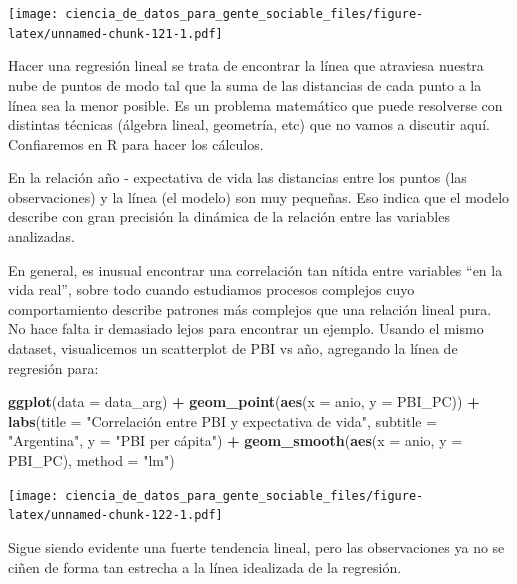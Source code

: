 \documentclass[spanish,]{book}
\newenvironment{Shaded}{\begin{snugshade}}{\end{snugshade}}
\newcommand{\DataTypeTok}[1]{\textcolor[rgb]{0.13,0.29,0.53}{#1}}
\newcommand{\KeywordTok}[1]{\textcolor[rgb]{0.13,0.29,0.53}{\textbf{#1}}}
\newcommand{\NormalTok}[1]{#1}
\newcommand{\OperatorTok}[1]{\textcolor[rgb]{0.81,0.36,0.00}{\textbf{#1}}}
\newcommand{\StringTok}[1]{\textcolor[rgb]{0.31,0.60,0.02}{#1}}
\begin{document}
\texttt{[image: ciencia\_de\_datos\_para\_gente\_sociable\_files/figure-latex/unnamed-chunk-121-1.pdf]}

Hacer una regresión lineal se trata de encontrar la línea que atraviesa nuestra nube de puntos de modo tal que la suma de las distancias de cada punto a la línea sea la menor posible. Es un problema matemático que puede resolverse con distintas técnicas (álgebra lineal, geometría, etc) que no vamos a discutir aquí. Confiaremos en R para hacer los cálculos.

En la relación año - expectativa de vida las distancias entre los puntos (las observaciones) y la línea (el modelo) son muy pequeñas. Eso indica que el modelo describe con gran precisión la dinámica de la relación entre las variables analizadas.

En general, es inusual encontrar una correlación tan nítida entre variables ``en la vida real'', sobre todo cuando estudiamos procesos complejos cuyo comportamiento describe patrones más complejos que una relación lineal pura. No hace falta ir demasiado lejos para encontrar un ejemplo. Usando el mismo dataset, visualicemos un scatterplot de PBI vs año, agregando la línea de regresión para:

\begin{Shaded}
\begin{Highlighting}[]
\KeywordTok{ggplot}\NormalTok{(}\DataTypeTok{data =}\NormalTok{ data_arg) }\OperatorTok{+}\StringTok{ }
\StringTok{    }\KeywordTok{geom_point}\NormalTok{(}\KeywordTok{aes}\NormalTok{(}\DataTypeTok{x =}\NormalTok{ anio, }\DataTypeTok{y =}\NormalTok{ PBI_PC)) }\OperatorTok{+}
\StringTok{    }\KeywordTok{labs}\NormalTok{(}\DataTypeTok{title =} \StringTok{"Correlación entre PBI y expectativa de vida"}\NormalTok{,}
         \DataTypeTok{subtitle =} \StringTok{"Argentina"}\NormalTok{,}
         \DataTypeTok{y =} \StringTok{"PBI per cápita"}\NormalTok{) }\OperatorTok{+}
\StringTok{    }\KeywordTok{geom_smooth}\NormalTok{(}\KeywordTok{aes}\NormalTok{(}\DataTypeTok{x =}\NormalTok{ anio, }\DataTypeTok{y =}\NormalTok{ PBI_PC), }\DataTypeTok{method =} \StringTok{"lm"}\NormalTok{)}
\end{Highlighting}
\end{Shaded}

\texttt{[image: ciencia\_de\_datos\_para\_gente\_sociable\_files/figure-latex/unnamed-chunk-122-1.pdf]}

Sigue siendo evidente una fuerte tendencia lineal, pero las observaciones ya no se ciñen de forma tan estrecha a la línea idealizada de la regresión.
\end{document}
